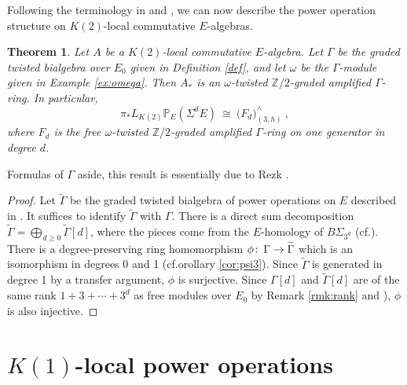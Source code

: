 \documentclass{gtpart}
\newtheorem{thm}{Theorem}
\theoremstyle{definition}
\theoremstyle{remark}
\def\co{\colon\thinspace}
\newcommand{\mb}[1]{\mathbb{#1}}
\newcommand{\cff}[2]{cf.\thinspace{\cite[#1]{#2}}}
\newcommand{\BP}{{\mb P}}
\newcommand{\BZ}{{\mb Z}}
\newcommand{\TG}{\widetilde{\G}}
\newcommand{\G}{\Gamma}
\begin{document}
Following the terminology in \cite[Section 2]{cong} and \cite[2.5 and 2.6]{h2p2}, we can now describe the power operation structure on $K(2)$-local commutative $E$-algebras.  
\begin{thm}
\label{thm}
 Let $A$ be a $K(2)$-local commutative $E$-algebra.  
 Let $\G$ be the graded twisted bialgebra over $E_0$ given in Definition \ref{def}, and let $\omega$ be the $\G$-module given in Example \ref{ex:omega}.  
 Then $A_*$ is an {\em $\omega$-twisted $\BZ/2$-graded amplified $\G$-ring}.  In particular, 
 \[
  \pi_* L_{K(2)} \BP_E (\Sigma^d E) ~ \cong ~ \big( F_d \big)_{(3,h)}^\wedge ~ , 
 \]
 where $F_d$ is the free $\omega$-twisted $\BZ/2$-graded amplified $\G$-ring on one generator in degree $d$.  
\end{thm}
Formulas of $\G$ aside, this result is essentially due to Rezk \cite{cong, h2p2}.  
\begin{proof}
 Let $\TG$ be the graded twisted bialgebra of power operations on $E$ described in \cite[Section 6]{cong}.  
 It suffices to identify $\TG$ with $\G$.  
 There is a direct sum decomposition $\TG = \bigoplus_{d \geq 0} \TG[d]$, where the pieces come from the $E$-homology of $B\Sigma_{3^d}$ (\cff{6.2}{cong}).  
 There is a degree-preserving ring homomorphism $\phi \co \G \to \TG$ which is an isomorphism in degrees 0 and 1 (cf.orollary \ref{cor:psi3}).  
 Since $\TG$ is generated in degree 1 by a transfer argument, $\phi$ is surjective.  
 Since $\G[d]$ and $\TG[d]$ are of the same rank $1 + 3 + \cdots + 3^d$ as free modules over $E_0$ by Remark \ref{rmk:rank} and \cite[Theorem 1.1]{Str98}), 
 $\phi$ is also injective.  
\end{proof}


\section{$K(1)$-local power operations}
\label{sec:K(1)}
\end{document}
